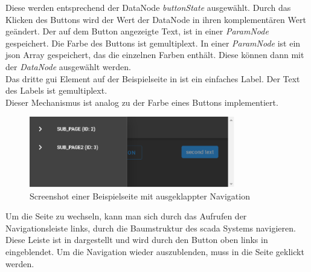 Diese werden entsprechend der DataNode \emph{buttonState} ausgewählt. 
Durch das Klicken des Buttons wird der Wert der DataNode in ihren komplementären Wert geändert.
Der auf dem Button angezeigte Text, ist in einer \emph{ParamNode} gespeichert. Die Farbe des Buttons ist gemultiplext.
In einer \emph{ParamNode} ist ein \ac{json} Array gespeichert, das die einzelnen Farben enthält.
Diese können dann mit der  \emph{DataNode} ausgewählt werden. 
\\Das dritte \ac{gui} Element auf der Beispielseite in  ist ein einfaches Label.
Der Text des Labels ist gemultiplext. \\Dieser Mechanismus ist analog zu der Farbe eines Buttons implementiert. 

\begin{figure}[ht]
  \centering
  \includegraphics[width=0.8\textwidth]{content/hauptteil/umsetzungPoC/frontend/res/nav.pdf}
  \caption{Screenshot einer Beispielseite mit ausgeklappter Navigation}
  \label{fig:frontend:poc:page:nav}
\end{figure}
Um die Seite zu wechseln, kann man sich durch das Aufrufen der Navigationsleiste links, durch die Baumstruktur des \ac{scada} Systems navigieren.
Diese Leiste ist in  dargestellt und wird durch den Button oben links in  eingeblendet.
Um die Navigation wieder auszublenden, muss in die Seite geklickt werden.